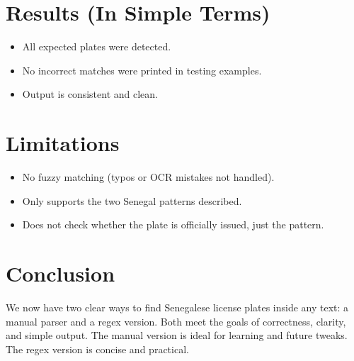 \documentclass[12pt,a4paper]{article}
\begin{document}
\section{Results (In Simple Terms)}
\begin{itemize}
    \item All expected plates were detected.
    \item No incorrect matches were printed in testing examples.
    \item Output is consistent and clean.
\end{itemize}

\section{Limitations}
\begin{itemize}
    \item No fuzzy matching (typos or OCR mistakes not handled).
    \item Only supports the two Senegal patterns described.
    \item Does not check whether the plate is officially issued, just the pattern.
\end{itemize}

\section{Conclusion}
We now have two clear ways to find Senegalese license plates inside any text: a manual parser and a regex version. Both meet the goals of correctness, clarity, and simple output. The manual version is ideal for learning and future tweaks. The regex version is concise and practical.
\end{document}
